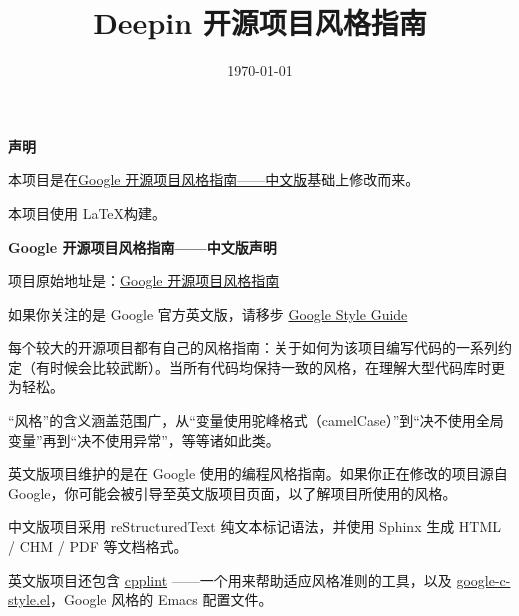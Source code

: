\documentclass[UTF8,a4paper,oneside]{ctexbook}
\title{Deepin 开源项目风格指南}
\date{\today}
\begin{document}
\maketitle

\textbf{声明}

本项目是在\href{https://github.com/zh-google-styleguide/zh-google-styleguide}{Google 开源项目风格指南——中文版}基础上修改而来。

本项目使用 \LaTeX 构建。

\textbf{Google 开源项目风格指南——中文版声明}

项目原始地址是：\href{https://github.com/zh-google-styleguide/zh-google-styleguide}{Google 开源项目风格指南}

如果你关注的是 Google 官方英文版，请移步 \href{https://github.com/google/styleguide}{Google Style Guide}

每个较大的开源项目都有自己的风格指南：关于如何为该项目编写代码的一系列约定（有时候会比较武断）。当所有代码均保持一致的风格，在理解大型代码库时更为轻松。

“风格”的含义涵盖范围广，从“变量使用驼峰格式（camelCase）”到“决不使用全局变量”再到“决不使用异常”，等等诸如此类。

英文版项目维护的是在 Google 使用的编程风格指南。如果你正在修改的项目源自 Google，你可能会被引导至英文版项目页面，以了解项目所使用的风格。

中文版项目采用 reStructuredText 纯文本标记语法，并使用 Sphinx 生成 HTML / CHM / PDF 等文档格式。

英文版项目还包含 \href{https://github.com/google/styleguide/tree/gh-pages/cpplint}{cpplint} ——一个用来帮助适应风格准则的工具，以及 \href{https://raw.githubusercontent.com/google/styleguide/gh-pages/google-c-style.el}{google-c-style.el}，Google 风格的 Emacs 配置文件。


\end{document}
